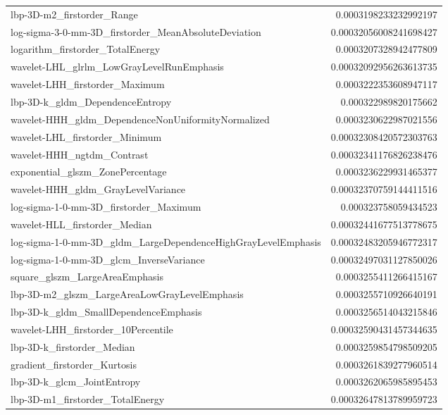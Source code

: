 {\begin{xltabular}[H]{\textwidth}{X r}
        lbp-3D-m2\_firstorder\_Range & 0.0003198233232992197 \\
        log-sigma-3-0-mm-3D\_firstorder\_MeanAbsoluteDeviation & 0.00032056008241698427 \\
        logarithm\_firstorder\_TotalEnergy & 0.0003207328942477809 \\
        wavelet-LHL\_glrlm\_LowGrayLevelRunEmphasis & 0.00032092956263613735 \\
        wavelet-LHH\_firstorder\_Maximum & 0.0003222353608947117 \\
        lbp-3D-k\_gldm\_DependenceEntropy & 0.000322989820175662 \\
        wavelet-HHH\_gldm\_DependenceNonUniformityNormalized & 0.0003230622987021556 \\
        wavelet-LHL\_firstorder\_Minimum & 0.00032308420572303763 \\
        wavelet-HHH\_ngtdm\_Contrast & 0.00032341176826238476 \\
        exponential\_glszm\_ZonePercentage & 0.0003236229931465377 \\
        wavelet-HHH\_gldm\_GrayLevelVariance & 0.00032370759144411516 \\
        log-sigma-1-0-mm-3D\_firstorder\_Maximum & 0.000323758059434523 \\
        wavelet-HLL\_firstorder\_Median & 0.00032441677513778675 \\
        log-sigma-1-0-mm-3D\_gldm\_LargeDependenceHighGrayLevelEmphasis & 0.00032483205946772317 \\
        log-sigma-1-0-mm-3D\_glcm\_InverseVariance & 0.00032497031127850026 \\
        square\_glszm\_LargeAreaEmphasis & 0.0003255411266415167 \\
        lbp-3D-m2\_glszm\_LargeAreaLowGrayLevelEmphasis & 0.0003255710926640191 \\
        lbp-3D-k\_gldm\_SmallDependenceEmphasis & 0.0003256514043215846 \\
        wavelet-LHH\_firstorder\_10Percentile & 0.00032590431457344635 \\
        lbp-3D-k\_firstorder\_Median & 0.0003259854798509205 \\
        gradient\_firstorder\_Kurtosis & 0.0003261839277960514 \\
        lbp-3D-k\_glcm\_JointEntropy & 0.0003262065985895453 \\
        lbp-3D-m1\_firstorder\_TotalEnergy & 0.00032647813789959723 \\

\end{xltabular}}
